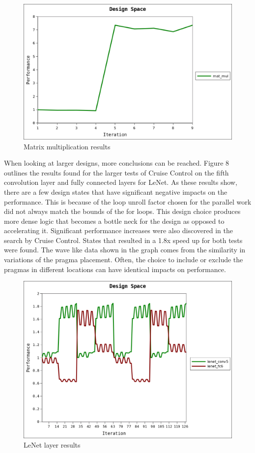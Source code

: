 \documentclass[letterpaper, 10 pt, conference]{IEEEconf}  %
\begin{document}
\begin{figure}[H]
\centering
\includegraphics[scale=.45]{result1.png} 
\caption{Matrix multiplication results}
\end{figure}

When looking at larger designs, more conclusions can be reached. Figure 8 outlines the results found for the larger tests of Cruise Control on the fifth convolution layer and fully connected layers for LeNet. As these results show, there are a few design states that have significant negative impacts on the performance. This is because of the loop unroll factor chosen for the parallel work did not always match the bounds of the for loops. This design choice produces more dense logic that becomes a bottle neck for the design as opposed to accelerating it. Significant performance increases were also discovered in the search by Cruise Control. States that resulted in a 1.8x speed up for both tests were found. The wave like data shown in the graph comes from the similarity in variations of the pragma placement. Often, the choice to include or exclude the pragmas in different locations can have identical impacts on performance. \newline

\begin{figure}[H]
\centering
\includegraphics[scale=.45]{result2.png} 
\caption{LeNet layer results}
\end{figure}
\end{document}
